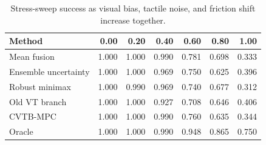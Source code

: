 \begin{table}[t]
\centering
\caption{Stress-sweep success as visual bias, tactile noise, and friction shift increase together.}
\label{tab:stress}
\scriptsize
\begin{tabular}{lrrrrrr}
\toprule
Method & 0.00 & 0.20 & 0.40 & 0.60 & 0.80 & 1.00 \\
\midrule
Mean fusion & 1.000 & 1.000 & 0.990 & 0.781 & 0.698 & 0.333 \\
Ensemble uncertainty & 1.000 & 1.000 & 0.969 & 0.750 & 0.625 & 0.396 \\
Robust minimax & 1.000 & 0.990 & 0.969 & 0.740 & 0.677 & 0.312 \\
Old VT branch & 1.000 & 1.000 & 0.927 & 0.708 & 0.646 & 0.406 \\
CVTB-MPC & 1.000 & 1.000 & 0.990 & 0.760 & 0.635 & 0.344 \\
Oracle & 1.000 & 1.000 & 0.990 & 0.948 & 0.865 & 0.750 \\
\bottomrule
\end{tabular}
\end{table}
